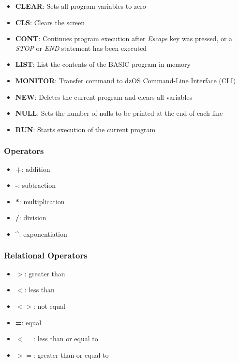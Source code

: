 \documentclass[a4paper,11pt]{article}
\begin{document}
    \begin{itemize}
        \item \textbf{CLEAR}: Sets all program variables to zero
        \item \textbf{CLS}: Clears the screen
        \item \textbf{CONT}: Continues program execution after \textit{Escape}
        key was pressed, or a \textit{STOP} or \textit{END} statement has
        been executed
        \item \textbf{LIST}: List the contents of the BASIC program in memory
        \item \textbf{MONITOR}: Transfer command to dzOS Command-Line
        Interface (CLI)
        \item \textbf{NEW}: Deletes the current program and clears all
        variables
        \item \textbf{NULL}: Sets the number of nulls to be printed at the
        end of each line
        \item \textbf{RUN}: Starts execution of the current program
    \end{itemize}

    \subsubsection{Operators}

    \begin{itemize}
        \item \textbf{+}: addition
        \item \textbf{-}: subtraction
        \item \textbf{*}: multiplication
        \item \textbf{/}: division
        \item \textbf{\textasciicircum}: exponentiation
    \end{itemize}

    \subsubsection{Relational Operators}
    
    \begin{itemize}
        \item \textbf{$>$}: greater than
        \item \textbf{$<$}: less than
        \item \textbf{$<>$}: not equal
        \item \textbf{=}: equal
        \item \textbf{$<=$}: less than or equal to
        \item \textbf{$>=$}: greater than or equal to
    \end{itemize}
\end{document}
